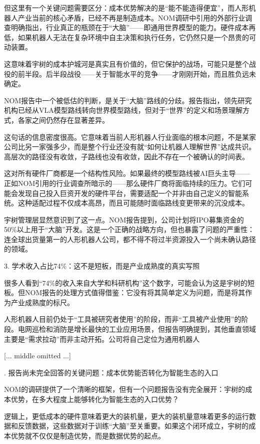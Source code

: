 \documentclass[11pt]{ctexart}
\begin{document}
但这里有一个关键问题需要区分：成本优势解决的是“能不能造得便宜”，而人形机器人产业当前的核心矛盾，已经不再是制造成本。NOM调研中引用的外部行业调查明确指出，行业真正的瓶颈在于“大脑”——即通用世界模型的能力。硬件成本再低，如果机器人无法在复杂环境中自主决策和执行任务，它仍然只是一个昂贵的可动装置。

这意味着宇树的成本护城河是真实且有价值的，但它保护的战场，可能只是整个战役的前半段。后半段战役——关于智能水平的竞争——才刚刚开始，而且胜负远未确定。

NOM报告中一个被低估的判断，是关于“大脑”路线的分歧。报告指出，领先研究机构已经从VLA模型路线转向世界模型路线，但对于“世界”的定义和场景理解方式，各家之间仍然存在显著差异。

这句话的信息密度很高。它意味着当前人形机器人行业面临的根本问题，不是某家公司比另一家强多少，而是整个行业还没有就“如何让机器人理解世界”达成共识。高层次的路径没有收敛，子路线也没有收敛，因此不存在一个被确认的时间表。

这对所有硬件厂商都是一个结构性风险。如果最终的模型路线被AI巨头主导——正如NOM引用的行业调查所暗示的——那么硬件厂商将面临持续的压力。它们可能会发现自己投入巨资开发的硬件平台，需要适配一个并非由自己定义的智能系统。这种适配过程不仅成本高昂，而且可能随时面临路线变更带来的沉没成本。

宇树管理层显然意识到了这一点。NOM报告提到，公司计划将IPO募集资金的50\%以上用于“大脑”开发。这是一个正确的战略方向，但也暴露了问题的严重性：连全球出货量第一的人形机器人公司，都不得不将过半资源投入一个尚未确认路径的领域。

3. 学术收入占比74\%：这不是短板，而是产业成熟度的真实写照

很多人看到“74\%的收入来自大学和科研机构”这个数字，可能会认为这是宇树的短板。但NOM报告的处理方式值得借鉴：它没有将其简单定义为问题，而是将其作为产业成熟度的标尺。

人形机器人目前仍处于“工具被研究者使用”的阶段，而非“工具被产业使用”的阶段。电网巡检和消防是增长最快的工业应用场景，但报告明确提到，其他垂直领域主要是“需求拉动”而非主动开拓。公司将自己定位为通用机器人

[... middle omitted ...]

. 报告尚未完全回答的关键问题：成本优势能否转化为智能生态的入口

NOM的调研提供了一个清晰的框架，但有一个问题报告没有完全展开：宇树的成本优势，在多大程度上能够转化为智能生态的入口优势？

逻辑上，更低成本的硬件意味着更大的装机量，更大的装机量意味着更多的运行数据和反馈数据，这些数据对于训练“大脑”至关重要。如果这个闭环成立，宇树的成本优势就不仅仅是制造优势，而是数据优势的起点。
\end{document}
